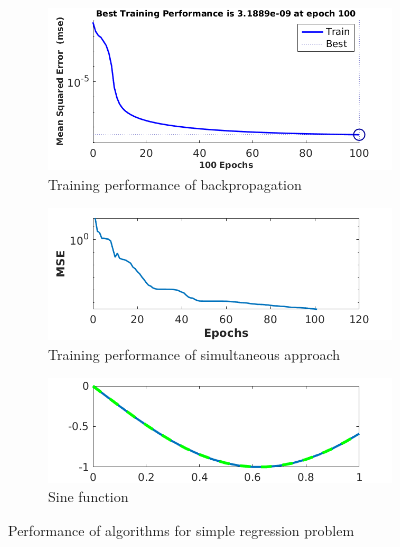 \begin{figure}
     \centering
     \begin{subfigure}[b]{0.8\textwidth}
         \centering
         \includegraphics[width=\textwidth]{back_test_1}
         \caption{Training performance of backpropagation}
         \label{fig:y equals x}
     \end{subfigure}
     \begin{subfigure}[b]{0.8\textwidth}
         \centering
         \includegraphics[width=\textwidth]{back_test_12}
         \caption{Training performance of simultaneous approach}
         \label{}
     \end{subfigure}
     \begin{subfigure}[b]{0.8\textwidth}
         \centering
         \includegraphics[width=\textwidth]{sine}
         \caption{Sine function}
         \label{}
     \end{subfigure}
        \caption{Performance of algorithms for simple regression problem}
        \label{fig:three graphs}
\end{figure}




